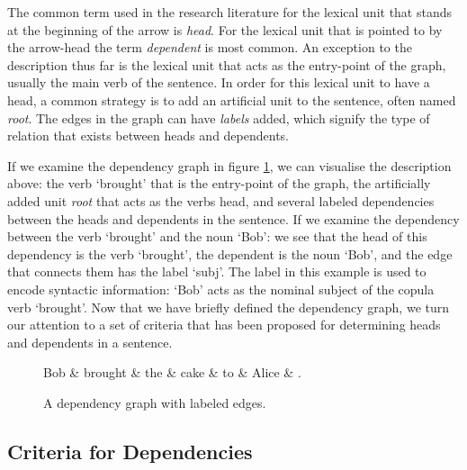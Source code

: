 The common term used in the research literature for the lexical unit that stands at the beginning of the arrow is \textit{head}. For the lexical unit that is pointed to by the arrow-head the term \textit{dependent} is most common. An exception to the description thus far is the lexical unit that acts as the entry-point of the graph, usually the main verb of the sentence. In order for this lexical unit to have a head, a common strategy is to add an artificial unit to the sentence, often named \textit{root}. The edges in the graph can have \textit{labels} added, which signify the type of relation that exists between heads and dependents. 

If we examine the dependency graph in figure \ref{dep1}, we can visualise the description above: the verb `brought' that is the entry-point of the graph, the artificially added unit \textit{root} that acts as the verbs head, and several labeled dependencies between the heads and dependents in the sentence. If we examine the dependency between the verb `brought' and the noun `Bob': we see that the head of this dependency is the verb `brought', the dependent is the noun `Bob', and the edge that connects them has the label `subj'. The label in this example is used to encode syntactic information: `Bob' acts as the nominal subject of the copula verb `brought'. Now that we have briefly defined the dependency graph, we turn our attention to a set of criteria that has been proposed for determining heads and dependents in a sentence.

\begin{figure}
    \begin{dependency}[]
        \begin{deptext}[column sep=1em, row sep=.1ex]
            Bob \& brought \& the \& cake \& to \& Alice \& . \\
        \end{deptext}
    \end{dependency}
    \caption{A dependency graph with labeled edges.}
    \label{dep1}
\end{figure}

\subsection{Criteria for Dependencies}
\label{criteria}

